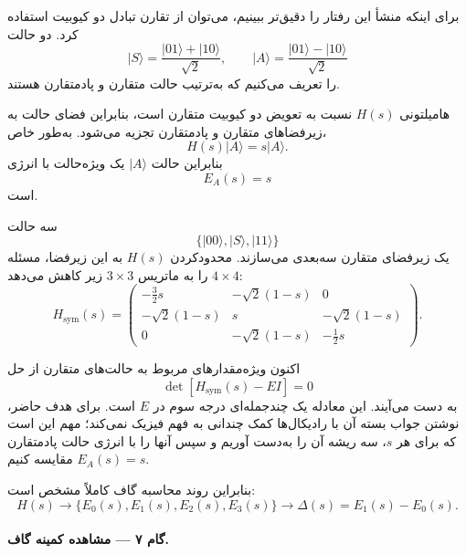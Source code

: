 برای اینکه منشأ این رفتار را دقیق‌تر ببینیم، می‌توان از تقارن تبادل دو کیوبیت استفاده کرد. دو حالت
\begin{equation}
	\lvert S\rangle
	=
	\frac{\lvert01\rangle+\lvert10\rangle}{\sqrt2},
	\qquad
	\lvert A\rangle
	=
	\frac{\lvert01\rangle-\lvert10\rangle}{\sqrt2}
\end{equation}
را تعریف می‌کنیم که به‌ترتیب حالت متقارن و پادمتقارن هستند.

هامیلتونی $H(s)$ نسبت به تعویض دو کیوبیت متقارن است، بنابراین فضای حالت به زیر‌فضاهای متقارن و پادمتقارن تجزیه می‌شود. به‌طور خاص،
\begin{equation}
	H(s)\lvert A\rangle
	=
	s\lvert A\rangle.
\end{equation}
بنابراین حالت $\lvert A\rangle$ یک ویژه‌حالت با انرژی
\begin{equation}
	E_A(s)=s
\end{equation}
است.

سه حالت
\begin{equation}
	\{
	\lvert00\rangle,
	\lvert S\rangle,
	\lvert11\rangle
	\}
\end{equation}
یک زیر‌فضای متقارن سه‌بعدی می‌سازند. محدودکردن $H(s)$ به این زیر‌فضا، مسئله $4\times4$ را به ماتریس $3\times3$ زیر کاهش می‌دهد:
\begin{equation}
	\label{eq:Hsym-example}
	H_{\mathrm{sym}}(s)
	=
	\begin{pmatrix}
		-\frac32s&-\sqrt2(1-s)&0\\
		-\sqrt2(1-s)&s&-\sqrt2(1-s)\\
		0&-\sqrt2(1-s)&-\frac12s
	\end{pmatrix}.
\end{equation}

اکنون ویژه‌مقدارهای مربوط به حالت‌های متقارن از حل
\begin{equation}
	\det\!\left[
	H_{\mathrm{sym}}(s)-E I
	\right]=0
\end{equation}
به دست می‌آیند. این معادله یک چندجمله‌ای درجه سوم در $E$ است. برای هدف حاضر، نوشتن جواب بسته آن با رادیکال‌ها کمک چندانی به فهم فیزیک نمی‌کند؛ مهم این است که برای هر $s$، سه ریشه آن را به‌دست آوریم و سپس آنها را با انرژی حالت پادمتقارن $E_A(s)=s$ مقایسه کنیم.

بنابراین روند محاسبه گاف کاملاً مشخص است:
\begin{equation}
	H(s)
	\longrightarrow
	\{E_0(s),E_1(s),E_2(s),E_3(s)\}
	\longrightarrow
	\Delta(s)=E_1(s)-E_0(s).
\end{equation}

\paragraph{گام ۷ --- مشاهده کمینه گاف.}

